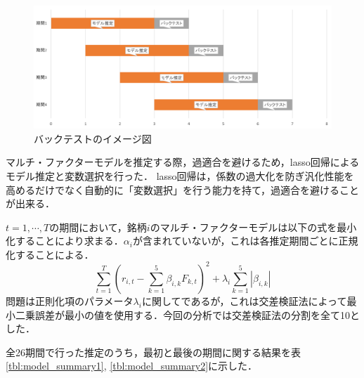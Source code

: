 ﻿\documentclass[11pt]{jreport}
\begin{document}
\begin{figure}[H]
	\begin{center}
		\includegraphics[width=15cm]{./fig/backtest.png}
		\caption{バックテストのイメージ図}
		\label{fig:backtest}
	\end{center}
\end{figure}


マルチ・ファクターモデルを推定する際，過適合を避けるため，lasso回帰によるモデル推定と変数選択を行った．
lasso回帰は，係数の過大化を防ぎ汎化性能を高めるだけでなく自動的に「変数選択」を行う能力を持て，過適合を避けることが出来る．

$t=1,\cdots,T$の期間において，銘柄$i$のマルチ・ファクターモデルは以下の式を最小化することにより求まる．$\alpha_i$が含まれていないが，これは各推定期間ごとに正規化することによる．
\begin{equation}
\sum_{t=1}^T\left(r_{i,t} - \sum_{k=1}^5\beta_{i,k}F_{k,t} \right)^2 + \lambda_i\sum_{k=1}^5|\beta_{i,k}|
\end{equation}
問題は正則化項のパラメータ$\lambda_i$に関してであるが，これは交差検証法によって最小二乗誤差が最小の値を使用する．今回の分析では交差検証法の分割を全て10とした．

全26期間で行った推定のうち，最初と最後の期間に関する結果を表\ref{tbl:model_summary1}, \ref{tbl:model_summary2}に示した．
\end{document}
